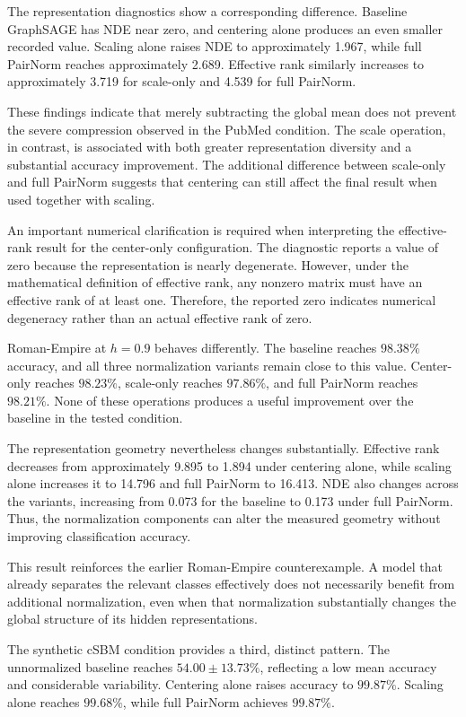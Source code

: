 \documentclass[english]{lni}
\begin{document}
The representation diagnostics show a corresponding difference. Baseline GraphSAGE has NDE near zero, and centering alone produces an even smaller recorded value. Scaling alone raises NDE to approximately 1.967, while full PairNorm reaches approximately 2.689. Effective rank similarly increases to approximately 3.719 for scale-only and 4.539 for full PairNorm.

These findings indicate that merely subtracting the global mean does not prevent the severe compression observed in the PubMed condition. The scale operation, in contrast, is associated with both greater representation diversity and a substantial accuracy improvement. The additional difference between scale-only and full PairNorm suggests that centering can still affect the final result when used together with scaling.

An important numerical clarification is required when interpreting the effective-rank result for the center-only configuration. The diagnostic reports a value of zero because the representation is nearly degenerate. However, under the mathematical definition of effective rank, any nonzero matrix must have an effective rank of at least one. Therefore, the reported zero indicates numerical degeneracy rather than an actual effective rank of zero.

Roman-Empire at $h=0.9$ behaves differently. The baseline reaches $98.38\%$ accuracy, and all three normalization variants remain close to this value. Center-only reaches $98.23\%$, scale-only reaches $97.86\%$, and full PairNorm reaches $98.21\%$. None of these operations produces a useful improvement over the baseline in the tested condition.

The representation geometry nevertheless changes substantially. Effective rank decreases from approximately 9.895 to 1.894 under centering alone, while scaling alone increases it to 14.796 and full PairNorm to 16.413. NDE also changes across the variants, increasing from 0.073 for the baseline to 0.173 under full PairNorm. Thus, the normalization components can alter the measured geometry without improving classification accuracy.

This result reinforces the earlier Roman-Empire counterexample. A model that already separates the relevant classes effectively does not necessarily benefit from additional normalization, even when that normalization substantially changes the global structure of its hidden representations.

The synthetic cSBM condition provides a third, distinct pattern. The unnormalized baseline reaches $54.00\pm13.73\%$, reflecting a low mean accuracy and considerable variability. Centering alone raises accuracy to $99.87\%$. Scaling alone reaches $99.68\%$, while full PairNorm achieves $99.87\%$.
\end{document}
